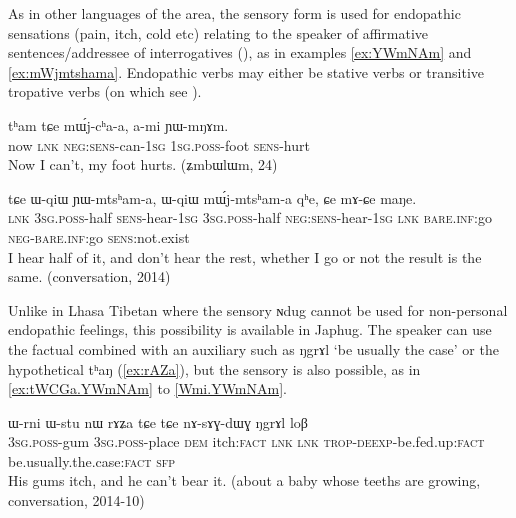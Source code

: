 \documentclass[oldfontcommands,oneside,a4paper,11pt]{article}
\newcommand{\ipa}[1]{{\phon \mbox{#1}}} %
\newcommand{\factual}[1]{\textsc{:fact}}
\begin{document}
As in other languages of the area, the sensory form is used for endopathic sensations (pain, itch, cold etc)  relating to the speaker of affirmative sentences/addressee of interrogatives (\citealt{tournadre14evidentiality}), as in examples \ref{ex:YWmNAm} and \ref{ex:mWjmtshama}. Endopathic verbs may either be stative verbs or transitive tropative verbs (on which see \citealt{jacques13tropative}).

\begin{exe}
\ex \label{ex:YWmNAm}
\gll
\ipa{tʰam} 	\ipa{tɕe} 	\ipa{mɯ́j-cʰa-a,} 	\ipa{a-mi} 	\ipa{ɲɯ-mŋɤm.} \\
now \textsc{lnk} \textsc{neg:sens}-can-\textsc{1sg} \textsc{1sg.poss}-foot \textsc{sens}-hurt \\
\glt Now I can't, my foot hurts. (\ipa{ʑmbɯlɯm}, 24)
\end{exe}

\begin{exe}
\ex \label{ex:mWjmtshama}
\gll
\ipa{tɕe} 	\ipa{ɯ-qiɯ} 	\ipa{ɲɯ-mtsʰam-a,} 	\ipa{ɯ-qiɯ} 	\ipa{mɯ́j-mtsʰam-a} 	\ipa{qʰe,} 	\ipa{ɕe} 	\ipa{mɤ-ɕe} 	\ipa{maŋe.} \\
\textsc{lnk} \textsc{3sg.poss}-half \textsc{sens}-hear-\textsc{1sg}   \textsc{3sg.poss}-half \textsc{neg:sens}-hear-\textsc{1sg}  \textsc{lnk}  \textsc{bare.inf}:go \textsc{neg}-\textsc{bare.inf}:go \textsc{sens}:not.exist \\
\glt I hear half of it, and don't hear the rest, whether I go or not the result is the same. (conversation, 2014)
\end{exe}


Unlike in Lhasa Tibetan where the sensory \ipa{ɴdug} cannot be used for non-personal endopathic feelings, this possibility is available in Japhug. The speaker can use the factual combined with an auxiliary such as \ipa{ŋgrɤl}  `be usually the case' or the hypothetical \ipa{tʰaŋ} (\ref{ex:rAZa}), but the sensory is also possible, as in \ref{ex:tWCGa.YWmNAm} to \ref{Wmi.YWmNAm}.


\begin{exe}
\ex \label{ex:rAZa}
\gll
\ipa{ɯ-rni}  	\ipa{ɯ-stu}  	\ipa{nɯ}  	\ipa{rɤʑa}  	\ipa{tɕe}  	\ipa{tɕe}  	\ipa{nɤ-sɤɣ-dɯɣ}  	\ipa{ŋgrɤl}  	\ipa{loβ}  \\
\textsc{3sg.poss}-gum \textsc{3sg.poss}-place \textsc{dem} itch\factual{} \textsc{lnk} \textsc{lnk} \textsc{trop-deexp}-be.fed.up\factual{} be.usually.the.case\factual{} \textsc{sfp} \\
\glt His gums itch, and he can't bear it. (about a baby whose teeths are growing, conversation, 2014-10)
\end{exe}
\end{document}
